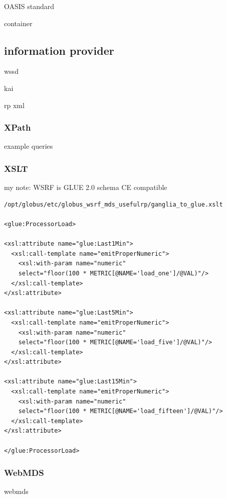 OASIS standard

container
\newpage
\subsection{information provider}
wssd

kai

rp xml

\newpage
\subsubsection{XPath}
example queries
\subsubsection{XSLT}
my note: WSRF is GLUE 2.0 schema CE compatible
\begin{verbatim}
/opt/globus/etc/globus_wsrf_mds_usefulrp/ganglia_to_glue.xslt

<glue:ProcessorLoad>

<xsl:attribute name="glue:Last1Min">
  <xsl:call-template name="emitProperNumeric">
    <xsl:with-param name="numeric" 
    select="floor(100 * METRIC[@NAME='load_one']/@VAL)"/>
  </xsl:call-template>
</xsl:attribute>

<xsl:attribute name="glue:Last5Min">
  <xsl:call-template name="emitProperNumeric">
    <xsl:with-param name="numeric" 
    select="floor(100 * METRIC[@NAME='load_five']/@VAL)"/>
  </xsl:call-template>
</xsl:attribute>

<xsl:attribute name="glue:Last15Min">
  <xsl:call-template name="emitProperNumeric">
    <xsl:with-param name="numeric" 
    select="floor(100 * METRIC[@NAME='load_fifteen']/@VAL)"/>
  </xsl:call-template>
</xsl:attribute>

</glue:ProcessorLoad>
\end{verbatim}
\newpage

\subsubsection{WebMDS}
webmds
